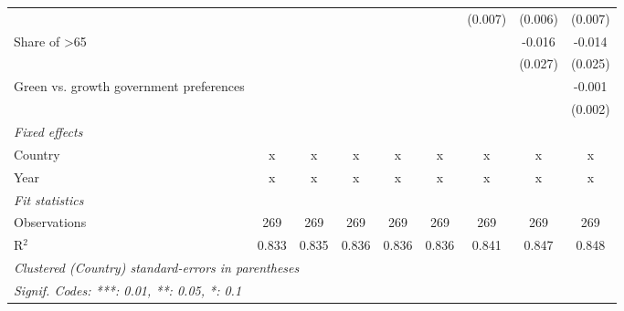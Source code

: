 \begin{table}[htbp]
\begin{tabular}{lcccccccc}
                                                         &         &         &         &         &         & (0.007) & (0.006) & (0.007)\\   
      Share of >65                                       &         &         &         &         &         &         & -0.016  & -0.014\\   
                                                         &         &         &         &         &         &         & (0.027) & (0.025)\\   
      Green vs. growth government preferences            &         &         &         &         &         &         &         & -0.001\\   
                                                         &         &         &         &         &         &         &         & (0.002)\\   
      \emph{Fixed effects}\\
      Country                                            & x       & x       & x       & x       & x       & x       & x       & x\\  
      Year                                               & x       & x       & x       & x       & x       & x       & x       & x\\  
      \midrule \emph{Fit statistics}\\
      Observations                                       & 269     & 269     & 269     & 269     & 269     & 269     & 269     & 269\\  
      R$^2$                                              & 0.833   & 0.835   & 0.836   & 0.836   & 0.836   & 0.841   & 0.847   & 0.848\\  
      \midrule
      \multicolumn{9}{l}{\emph{Clustered (Country) standard-errors in parentheses}}\\
      \multicolumn{9}{l}{\emph{Signif. Codes: ***: 0.01, **: 0.05, *: 0.1}}\\
   \end{tabular}
\end{table}


